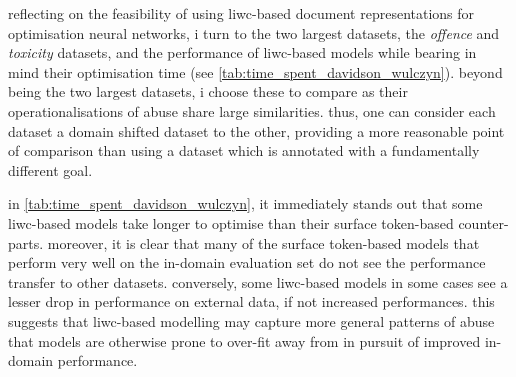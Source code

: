 reflecting on the feasibility of using liwc-based document representations for optimisation neural networks, i turn to the two largest datasets, the \textit{offence} and \textit{toxicity} datasets, and the performance of liwc-based models while bearing in mind their optimisation time (see \cref{tab:time_spent_davidson_wulczyn}).
beyond being the two largest datasets, i choose these to compare as their operationalisations of abuse share large similarities. 
thus, one can consider each dataset a domain shifted dataset to the other, providing a more reasonable point of comparison than using a dataset which is annotated with a fundamentally different goal.

in \cref{tab:time_spent_davidson_wulczyn}, it immediately stands out that some liwc-based models take longer to optimise than their surface token-based counter-parts.
moreover, it is clear that many of the surface token-based models that perform very well on the in-domain evaluation set do not see the performance transfer to other datasets.
conversely, some liwc-based models in some cases see a lesser drop in performance on external data, if not increased performances.
this suggests that liwc-based modelling may capture more general patterns of abuse that models are otherwise prone to over-fit away from in pursuit of improved in-domain performance.

